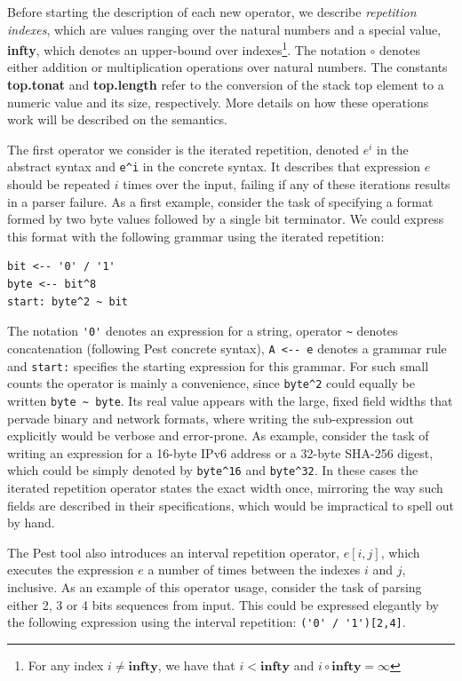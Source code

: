 \documentclass[preprint,12pt]{elsarticle}
\theoremstyle{definition}
\begin{document}
Before starting the description of each new operator, we describe
\emph{repetition indexes}, which are values ranging over the natural numbers and a
special value, \textbf{infty}, which denotes an upper-bound over
indexes\footnote{For any index $i \neq \mathbf{infty}$, we have
that $i < \mathbf{infty}$ and $i \circ \mathbf{infty} = \infty$}.
The notation $\circ$ denotes either addition
or multiplication operations over natural numbers. The constants
\textbf{top.tonat} and \textbf{top.length} refer to the conversion
of the stack top element to a numeric value and its size, respectively.
More details on how these operations work will be described
on the semantics.

The first operator we consider is the iterated repetition, denoted $e^i$ in
the abstract syntax and \verb|e^i| in the concrete syntax. It describes that
expression $e$ should be repeated $i$ times over the input, failing if any of these iterations
results in a parser failure. As a first example, consider the task of specifying a format formed by two byte
values followed by a single bit terminator. We could express this format with the
following grammar using the iterated repetition:
\begin{verbatim}
bit <-- '0' / '1'
byte <-- bit^8
start: byte^2 ~ bit
\end{verbatim}
The notation \verb|'0'| denotes an expression for a string,
operator \verb|~| denotes concatenation (following Pest concrete syntax),
\verb|A <-- e| denotes a grammar rule and \verb|start:| specifies
the starting expression for this grammar.
For such small counts the operator is mainly a convenience, since \verb|byte^2|
could equally be written \verb|byte ~ byte|. Its real value appears with the
large, fixed field widths that pervade binary and network formats, where writing
the sub-expression out explicitly would be verbose and error-prone. As example,
consider the task of writing an expression for a 16-byte IPv6 address or 
a 32-byte SHA-256 digest, which could be simply denoted by \verb|byte^16| and
\verb|byte^32|. In these cases the iterated repetition
operator states the exact width once, mirroring the way such fields are
described in their specifications, which would be impractical to spell out by hand.

The Pest tool also introduces an interval repetition operator, $e[i,j]$,
which executes the expression $e$ a number of times between the indexes $i$
and $j$, inclusive. As an example of this operator usage, consider the
task of parsing either 2, 3 or 4 bits sequences from input. This could be
expressed elegantly by the following expression using the interval repetition:
\verb|('0' / '1')[2,4]|.
\end{document}
